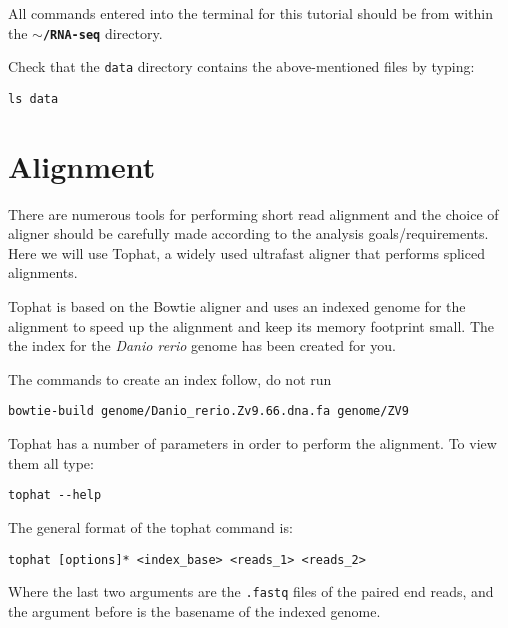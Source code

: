 \begin{warning}
  All commands entered into the terminal for this tutorial should be from within the
  \textbf{\texttt{$\sim$/RNA-seq}} directory.
\end{warning}

\begin{steps}
Check that the \texttt{data} directory contains the above-mentioned files by typing:
\begin{lstlisting}
ls data
\end{lstlisting}
\end{steps}

\section{Alignment}
There are numerous tools for performing short read alignment and the choice of aligner
should be carefully made according to the analysis goals/requirements. Here we will
use Tophat, a widely used ultrafast aligner that performs spliced alignments.

Tophat is based on the Bowtie aligner and uses an indexed genome for the
alignment to speed up the alignment and keep its memory footprint small. 
The the index for the \textit{Danio rerio} genome has been created for you. 

\begin{warning}
The commands to create an index follow, do not run
\begin{lstlisting}
bowtie-build genome/Danio_rerio.Zv9.66.dna.fa genome/ZV9
\end{lstlisting}
\end{warning}

\begin{steps}
Tophat has a number of parameters in order to perform the alignment. To view them all type:
\begin{lstlisting}
tophat --help
\end{lstlisting}
\end{steps}

\begin{information}
The general format of the tophat command is:
\begin{lstlisting}[style=command_syntax]
tophat [options]* <index_base> <reads_1> <reads_2>
\end{lstlisting}

Where the last two arguments are the \texttt{.fastq} files of the paired end
reads, and the argument before is the basename of the indexed genome.
\end{information}

